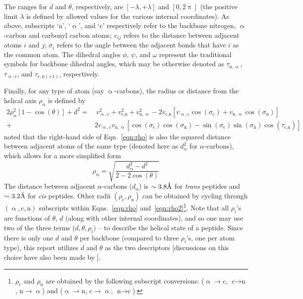 \documentclass[fleqn,10pt,lineno]{wlpeerj} %
\newcommand{\n}[1]{{\color{black}#1}} %
\newcommand{\Eqn}[1]{Eqn.~\ref{#1}}
\newcommand{\Eqns}[1]{Eqns.~\ref{#1}}
\newcommand{\cis}{{\em cis}\xspace}
\newcommand{\trans}{{\em trans}\xspace}
\begin{document}
\n{The ranges for $d$ and $\theta$, respectively, are $[-\lambda,+\lambda]$ and $[0,2\uppi]$ (the positive limit $\lambda$ is defined by allowed values for the various internal coordinates).} As above, subscripts `$\textrm{n}$', `$\upalpha$', and `$\textrm{c}$' respectively refer to the backbone nitrogen, $\upalpha$-carbon and carbonyl carbon atoms; $v_{ij}$ refers to the distance between adjacent atoms $i$ and $j$; $\sigma_i$ refers to the angle between the adjacent bonds that have $i$ as the common atom. The dihedral angles $\phi$, $\psi$, and $\omega$ represent the traditional  symbols for backbone dihedral angles, which may be otherwise denoted as $\tau_{\textrm{n},\upalpha}$, $\tau_{\upalpha,\textrm{c}}$, and $\tau_{\textrm{c},\textrm{n}(+1)}$, respectively. 

\n{Finally, for any type of atom (say $\upalpha$-carbons), the radius or distance from the helical axis $\rho_\upalpha$ is defined by
\begin{align} 
2 \rho_\upalpha^2 \left[1 - \cos(\theta)\right] + d^2 = & ~v_{\upalpha,\textrm{c}}^2 + v_{\textrm{c},\textrm{n}}^2 + v_{\textrm{n},\upalpha}^2 - 2 v_{\textrm{c},\textrm{n}}\left[v_{\upalpha,\textrm{c}}\cos(\sigma_\textrm{c}) + v_{\textrm{n},\upalpha}\cos(\sigma_\textrm{n})\right] \nonumber \\
                                                  + & 2 v_{\upalpha,\textrm{c}} v_{\textrm{n},\upalpha}\left[\cos(\sigma_\textrm{c})\cos(\sigma_\textrm{n}) - \sin(\sigma_\textrm{c})\sin(\sigma_\textrm{n})\cos(\tau_{\textrm{c},\textrm{n}})\right]
\label{eqn:rho}
\end{align}
\cite{Miyazawa1961} noted that the right-hand side of \Eqn{eqn:rho} is also the squared distance between adjacent atoms of the same type (denoted here as $d_\upalpha^2$ for $\alpha$-carbons), which allows for a more simplified form
\begin{equation}
\label{eqn:rho2}
\rho_\upalpha = \sqrt{\frac{d_\upalpha^2 - d^2}{2-2\cos(\theta)}}
\end{equation}
The distance between adjacent $\alpha$-carbons ($d_\upalpha$) is $\sim 3.8\textrm\AA$ for \trans peptides and $\sim 3.2\textrm\AA$ for \cis peptides. Other radii $(\rho_\textrm{c}, \rho_\textrm{n})$ can be obtained by cycling through $(\upalpha,\textrm{c},\textrm{n})$ subscripts within \Eqns{eqn:rho} and~\ref{eqn:rho2}\footnote{$\rho_\textrm{c}$ and $\rho_\textrm{n}$ are obtained by the following subscript conversions: ($\upalpha \to \textrm{c}$, $\textrm{c} \to \textrm{n}$, $\textrm{n} \to \upalpha$) and ($\upalpha \to \textrm{n}$, $\textrm{c} \to \upalpha$, $\textrm{n} \to \textrm{c}$).}. Note that all $\rho_i$'s are functions of $\theta$, $d$ (along with other internal coordinates), and so one may use two of the three terms ($d,\theta,\rho_i)$ -- to describe the helical state of a peptide. Since there is only one $d$ and $\theta$ per backbone (compared to three $\rho_i$'s, one per atom type), this report utilizes $d$ and $\theta$ as the two descriptors [discussions on this choice have also been made by \cite{Zacharias2013}].}
\end{document}
